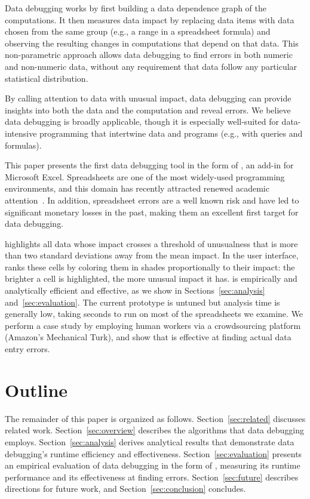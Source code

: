 Data debugging works by first building a data dependence graph of the
computations. It then measures data impact by replacing data items
with data chosen from the same group (e.g., a range in a spreadsheet
formula) and observing the resulting changes in computations that
depend on that data. This non-parametric approach allows data
debugging to find errors in both numeric and non-numeric data, without
any requirement that data follow any particular statistical
distribution.

By calling attention to data with unusual impact, data debugging can
provide insights into both the data and the computation and reveal
errors. We believe data debugging is broadly applicable, though it is
especially well-suited for data-intensive programming that intertwine
data and programs (e.g., with queries and formulas).

This paper presents the first data debugging tool in the form
of \checkcell{}, an add-in for Microsoft Excel. Spreadsheets are one
of the most widely-used programming environments, and this domain has
recently attracted renewed academic
attention~\cite{DBLP:conf/popl/Gulwani11,DBLP:conf/pldi/HarrisG11,Singh:2012:LSS:2212351.2212356}.
In addition, spreadsheet errors are a well known risk and have led to
significant monetary losses in the past, making them an excellent
first target for data debugging.

\checkcell{} highlights all data whose
impact crosses a threshold of unusualness that is more than two standard deviations away from the mean impact.  In the user interface, \checkcell{} ranks these cells by coloring them in
shades proportionally to their impact: the brighter a cell is
highlighted, the more unusual impact it has.
\checkcell{} is empirically and analytically efficient and effective, as we show in Sections~\ref{sec:analysis} and~\ref{sec:evaluation}. The current prototype is untuned but
analysis time is generally low, taking seconds to run on most of the
spreadsheets we examine. We perform a case study by employing human
workers via a crowdsourcing platform (Amazon's Mechanical Turk), and
show that \checkcell{} is effective at finding actual data entry
errors.

\section*{Outline}

The remainder of this paper is organized as
follows. Section~\ref{sec:related} discusses related
work. Section~\ref{sec:overview} describes the algorithms that data
debugging employs. Section~\ref{sec:analysis} derives analytical
results that demonstrate data debugging's runtime efficiency and
effectiveness. Section~\ref{sec:evaluation} presents an empirical
evaluation of data debugging in the form of \checkcell{}, measuring
its runtime performance and its effectiveness at finding
errors. Section~\ref{sec:future} describes directions for future work,
and Section~\ref{sec:conclusion} concludes.

